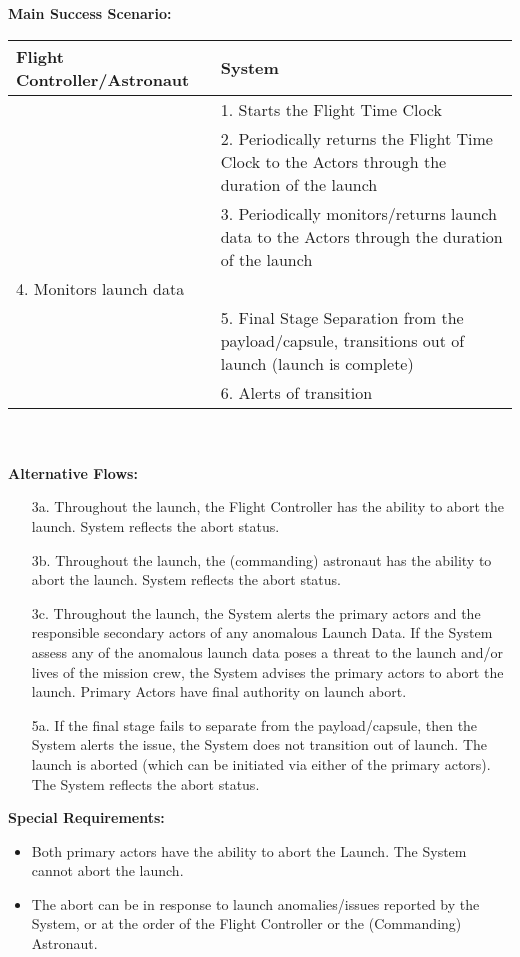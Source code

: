 \documentclass[letterpaper]{article}
\begin{document}
\textbf{Main Success Scenario:  }\\
\begin{tabular}{|p{5.75cm}|p{5.75cm}|}\hline
\textbf{Flight Controller/Astronaut}&\textbf{System}\\\hline
&1. Starts the Flight Time Clock\\\hline
&2. Periodically returns the Flight Time Clock to the Actors through
the duration of the launch\\\hline
&3. Periodically monitors/returns launch data to the Actors through
the duration of the launch\\\hline
4.  Monitors launch data &\\\hline
&5. Final Stage Separation from the payload/capsule, transitions out
of launch (launch is complete)\\\hline
&6. Alerts of transition\\\hline
\end{tabular}\\\\
\textbf{Alternative Flows:}
\begin{itemize}
\item[3a.]Throughout the launch, the Flight Controller has the 
ability to abort the launch.  System reflects the abort status.
\item[3b.]Throughout the launch, the (commanding) astronaut has
the ability to abort the launch.  System reflects the abort status.
\item[3c.]Throughout the launch, the System alerts the primary actors
and the responsible secondary actors of any anomalous Launch Data.
If the System assess any of the anomalous launch data poses a threat
to the launch and/or lives of the mission crew, the System advises the
primary actors to abort the launch.  Primary Actors have final
authority on launch abort.
\item[5a.]If the final stage fails to separate from the
payload/capsule, then the System alerts the issue, the System does not
transition out of launch.  The launch is aborted
(which can be initiated via either of the primary actors).  The
System reflects the abort status.
\end{itemize}
\textbf{Special Requirements:}
\begin{itemize}
\item Both primary actors have the ability to abort the Launch. The
System cannot abort the launch.
\item The abort can be in response to launch anomalies/issues
reported by the System, or at the order of the Flight Controller or
the (Commanding) Astronaut.
\end{itemize}
\end{document}
